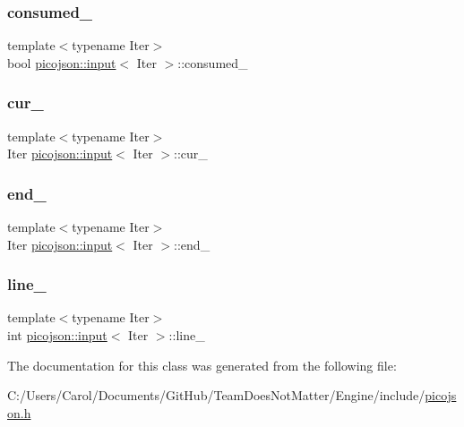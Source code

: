 \subsubsection{\texorpdfstring{consumed\+\_\+}{consumed\_}}
{\footnotesize\ttfamily template$<$typename Iter$>$ \\
bool \hyperlink{classpicojson_1_1input}{picojson\+::input}$<$ Iter $>$\+::consumed\+\_\+\hspace{0.3cm}{\ttfamily [protected]}}

\hypertarget{classpicojson_1_1input_afb97b3422a91d0f3388527a5999c8174}{}\label{classpicojson_1_1input_afb97b3422a91d0f3388527a5999c8174} 
\subsubsection{\texorpdfstring{cur\+\_\+}{cur\_}}
{\footnotesize\ttfamily template$<$typename Iter$>$ \\
Iter \hyperlink{classpicojson_1_1input}{picojson\+::input}$<$ Iter $>$\+::cur\+\_\+\hspace{0.3cm}{\ttfamily [protected]}}

\hypertarget{classpicojson_1_1input_acb4fd4c90d1b0db37bc32ccae16361ab}{}\label{classpicojson_1_1input_acb4fd4c90d1b0db37bc32ccae16361ab} 
\subsubsection{\texorpdfstring{end\+\_\+}{end\_}}
{\footnotesize\ttfamily template$<$typename Iter$>$ \\
Iter \hyperlink{classpicojson_1_1input}{picojson\+::input}$<$ Iter $>$\+::end\+\_\+\hspace{0.3cm}{\ttfamily [protected]}}

\hypertarget{classpicojson_1_1input_a7bbb41c7f78ffc19d3219e38c2858b74}{}\label{classpicojson_1_1input_a7bbb41c7f78ffc19d3219e38c2858b74} 
\subsubsection{\texorpdfstring{line\+\_\+}{line\_}}
{\footnotesize\ttfamily template$<$typename Iter$>$ \\
int \hyperlink{classpicojson_1_1input}{picojson\+::input}$<$ Iter $>$\+::line\+\_\+\hspace{0.3cm}{\ttfamily [protected]}}



The documentation for this class was generated from the following file\+:\begin{DoxyCompactItemize}
\item 
C\+:/\+Users/\+Carol/\+Documents/\+Git\+Hub/\+Team\+Does\+Not\+Matter/\+Engine/include/\hyperlink{picojson_8h}{picojson.\+h}\end{DoxyCompactItemize}
